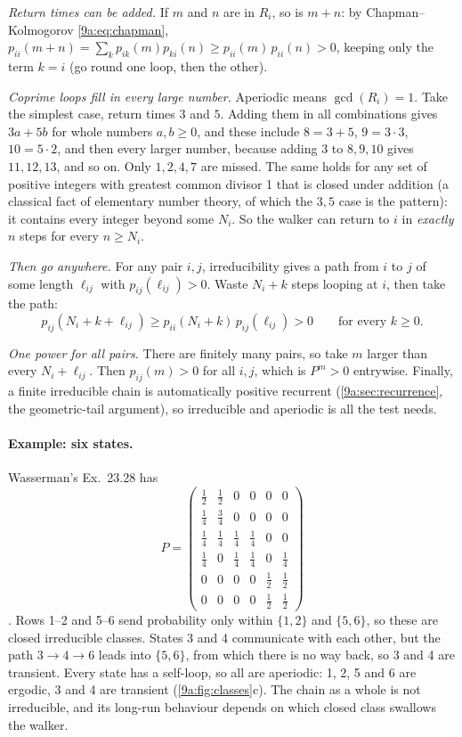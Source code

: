 \emph{Return times can be added.} If $m$ and $n$ are in $R_i$, so is $m+n$: by
Chapman--Kolmogorov \eqref{9a:eq:chapman}, $p_{ii}(m+n)=\sum_kp_{ik}(m)p_{ki}(n)\ge
p_{ii}(m)\,p_{ii}(n)>0$, keeping only the term $k=i$ (go round one loop, then the other).

\emph{Coprime loops fill in every large number.} Aperiodic means $\gcd(R_i)=1$. Take the simplest
case, return times $3$ and $5$. Adding them in all combinations gives $3a+5b$ for whole numbers
$a,b\ge0$, and these include $8=3+5$, $9=3\cdot3$, $10=5\cdot2$, and then every larger number,
because adding $3$ to $8,9,10$ gives $11,12,13$, and so on. Only $1,2,4,7$ are missed. The
same holds for any set of positive integers with greatest common divisor 1 that is closed under
addition (a classical fact of elementary number theory, of which the $3,5$ case is the
pattern): it contains every integer beyond some $N_i$. So the walker can return to $i$ in
\emph{exactly} $n$ steps for every $n\ge N_i$.

\emph{Then go anywhere.} For any pair $i,j$, irreducibility gives a path from $i$ to $j$ of some
length $\ell_{ij}$ with $p_{ij}(\ell_{ij})>0$. Waste $N_i+k$ steps looping at $i$, then take
the path:
\begin{equation*}
  p_{ij}(N_i+k+\ell_{ij})\ge p_{ii}(N_i+k)\,p_{ij}(\ell_{ij})>0\qquad\text{for every }k\ge0 .
\end{equation*}

\emph{One power for all pairs.} There are finitely many pairs, so take $m$ larger than every
$N_i+\ell_{ij}$. Then $p_{ij}(m)>0$ for all $i,j$, which is $P^m>0$ entrywise. Finally, a
finite irreducible chain is automatically positive recurrent (\cref{9a:sec:recurrence}, the
geometric-tail argument), so irreducible and aperiodic is all the test needs.

\paragraph{Example: six states.}
Wasserman's Ex.~23.28 has
\begin{equation*}
  P=\begin{pmatrix}
    \tfrac12&\tfrac12&0&0&0&0\\[1pt]
    \tfrac14&\tfrac34&0&0&0&0\\[1pt]
    \tfrac14&\tfrac14&\tfrac14&\tfrac14&0&0\\[1pt]
    \tfrac14&0&\tfrac14&\tfrac14&0&\tfrac14\\[1pt]
    0&0&0&0&\tfrac12&\tfrac12\\[1pt]
    0&0&0&0&\tfrac12&\tfrac12
  \end{pmatrix}
\end{equation*}
. Rows 1--2 and 5--6 send probability only within $\{1,2\}$ and $\{5,6\}$, so
these are closed irreducible classes. States 3 and 4 communicate with each other, but the path
$3\to4\to6$ leads into $\{5,6\}$, from which there is no way back, so 3 and 4 are transient.
Every state has a self-loop, so all are aperiodic: 1, 2, 5 and 6 are ergodic, 3 and 4 are
transient (\cref{9a:fig:classes}c). The chain as a whole is not irreducible, and its long-run
behaviour depends on which closed class swallows the walker.


